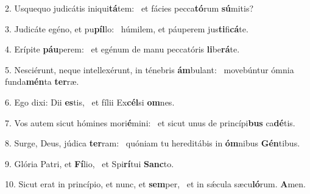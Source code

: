 2. Usquequo judicátis iniqui\textbf{tá}tem: \ast\  et fácies pecca\textbf{tó}rum \textbf{sú}mitis?\

3. Judicáte egéno, et pu\textbf{píl}lo: \ast\  húmilem, et páuperem jus\textbf{ti}fi\textbf{cá}te.\

4. Erípite \textbf{páu}perem: \ast\  et egénum de manu peccatóris \textbf{li}be\textbf{rá}te.\

5. Nesciérunt, neque intellexérunt, in ténebris \textbf{ám}bulant: \ast\  movebúntur ómnia funda\textbf{mén}ta \textbf{ter}ræ.\

6. Ego dixi: Dii \textbf{es}tis, \ast\  et fílii Ex\textbf{cél}si \textbf{om}nes.\

7. Vos autem sicut hómines mori\textbf{é}mini: \ast\  et sicut unus de princípi\textbf{bus} ca\textbf{dé}tis.\

8. Surge, Deus, júdica \textbf{ter}ram: \ast\  quóniam tu hereditábis in \textbf{óm}nibus \textbf{Gén}tibus.\

9. Glória Patri, et \textbf{Fí}lio, \ast\  et Spi\textbf{rí}tui \textbf{Sanc}to.\

10. Sicut erat in princípio, et nunc, et \textbf{sem}per, \ast\  et in sǽcula sæcu\textbf{ló}rum. \textbf{A}men.\

